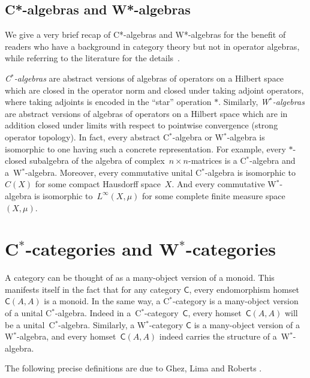 \documentclass[reqno,T1,11pt]{amsproc}
\newcommand{\cat}[1]{\mathsf{#1}}		%
\theoremstyle{plain}
\theoremstyle{remark}
\numberwithin{equation}{section}
\begin{document}
\subsection*{C*-algebras and W*-algebras}  We give a very brief recap of C*-algebras and W*-algebras for the benefit of readers who have a background in category theory but not in operator algebras, while referring to the literature for the details~\cite{sakai}.
 
\emph{C$^*$-algebras} are abstract versions of algebras of operators on a Hilbert space which are closed in the operator norm and closed under taking adjoint operators, where taking adjoints is encoded in the ``star'' operation $*$. Similarly, \emph{W$^*$-algebras} are abstract versions of algebras of operators on a Hilbert space which are in addition closed under limits with respect to pointwise convergence (strong operator topology). In fact, every abstract C$^*$-algebra or W$^*$-algebra is isomorphic to one having such a concrete representation. For example, every $*$-closed subalgebra of the algebra of complex~$n\times n$-matrices is a C$^*$-algebra and a~W$^*$-algebra. Moreover, every commutative unital C$^*$-algebra is isomorphic to~$C(X)$ for some compact Hausdorff space~$X$. And every commutative W$^*$-algebra is isomorphic to~$L^\infty(X,\mu)$ for some complete finite measure space~$(X,\mu)$.

\section{C$^*$-categories and W$^*$-categories}
\label{background}

A category can be thought of as a many-object version of a monoid. This manifests itself in the fact that for any category $\cat{C}$, every endomorphism homset $\cat{C}(A,A)$ is a monoid. In the same way, a C$^*$-category is a many-object version of a unital C$^*$-algebra. Indeed in a~C$^*$-category~$\cat{C}$, every homset~$\cat{C}(A,A)$ will be a unital~C$^*$-algebra. Similarly, a W$^*$-category $\cat{C}$ is a many-object version of a W$^*$-algebra, and every homset~$\cat{C}(A,A)$ indeed carries the structure of a~W$^*$-algebra.

    The following precise definitions are due to Ghez, Lima and Roberts \cite{wstarcat}.
\end{document}
